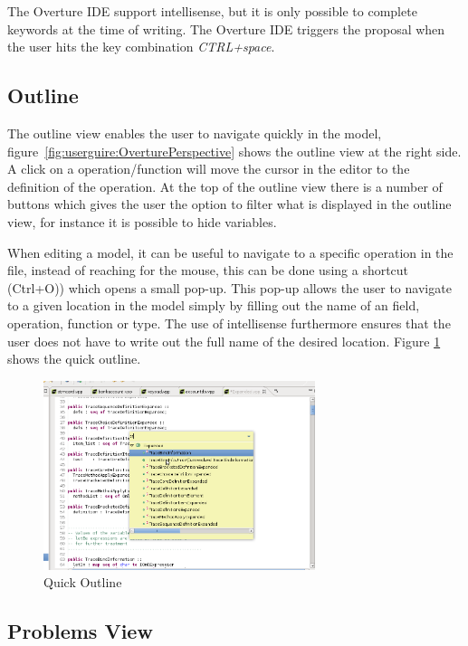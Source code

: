 The Overture IDE support intellisense, but it is only possible
to complete keywords at the time of writing. The Overture IDE triggers the
proposal when the user hits the key combination \textit{CTRL+space}.  

\subsection{Outline}

The outline view enables the user to navigate quickly in the model,
figure~\ref{fig:userguire:OverturePerspective} shows the outline view at the right
side. A click on a operation/function will move the cursor in the editor to
the definition of the operation. At the top of the outline view there
is a number of buttons which gives the user the option to filter what
is displayed in the outline view, for instance it is possible to hide
variables.

When editing a model, it can be useful to navigate to a specific operation in the
file, instead of reaching for the mouse, this can be done using a shortcut
(Ctrl+O)) which opens a small pop-up. This pop-up allows the user to navigate to
a given location in the model simply by filling out the name of an field,
operation, function or type. The use of intellisense furthermore ensures that the
user does not have to write out the full name of the desired location. Figure
\ref{fig:userguide:quickOutline} shows the quick outline.

\begin{figure}
	\begin{center}
	\includegraphics[width=300px]{figures/quickOutline}
	\caption[Quick Outline]{Quick Outline}
	\label{fig:userguide:quickOutline}
	\end{center}
\end{figure}

\subsection{Problems View}

